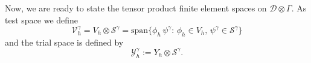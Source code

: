 \documentclass[a4paper,10pt]{article}
\newcommand{\cD}{{\mathcal{D}}}
\numberwithin{theorem}{section}
\begin{document}

Now, we are ready to state the tensor product finite element spaces on $\mathcal{D} \otimes \Gamma $. As test space we define
\begin{equation*}
  \mathcal{V}_h^{\gamma} = V_h \otimes \mathcal{S}^{\gamma} = \text{span}\{
  \phi_h \, \psi^{\gamma}: \, \phi_h \in V_h, \, \psi^{\gamma} \in \mathcal{S}^{\gamma}
  \}
\end{equation*}
and the trial space is defined by
\begin{equation*}
	\mathcal{Y}_h^\gamma	 := Y_h\otimes \mathcal S^\gamma.
\end{equation*}
\end{document}

